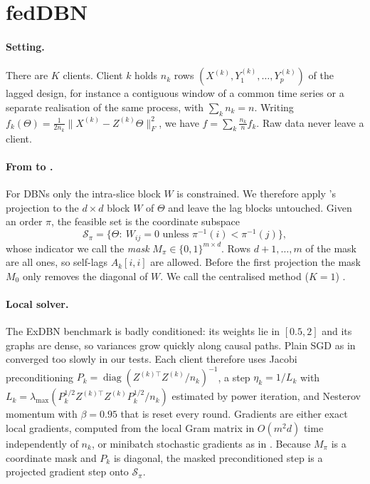 \section{fedDBN}
\label{sec:method}

\paragraph{Setting.}
There are $K$ clients. Client $k$ holds $n_k$ rows $(X^{(k)}, Y^{(k)}_1,\dots,Y^{(k)}_p)$ of
the lagged design, for instance a contiguous window of a common time series or a separate
realisation of the same process, with $\sum_k n_k=n$. Writing
$f_k(\Theta)=\frac{1}{2n_k}\|X^{(k)}-Z^{(k)}\Theta\|_F^2$, we have
$f=\sum_k \frac{n_k}{n} f_k$. Raw data never leave a client.

\paragraph{From \psidag{} to \psidbn.}
For DBNs only the intra-slice block $W$ is constrained. We therefore apply \psidag's
projection to the $d\times d$ block $W$ of $\Theta$ and leave the lag blocks
untouched. Given an order $\pi$, the feasible set is the coordinate subspace
\[
  \mathcal{S}_\pi=\{\Theta:\ W_{ij}=0 \text{ unless } \pi^{-1}(i)<\pi^{-1}(j)\},
\]
whose indicator we call the \emph{mask} $M_\pi\in\{0,1\}^{m\times d}$. Rows $d+1,\dots,m$ of the
mask are all ones, so self-lags $A_k[i,i]$ are allowed. Before the first projection the mask
$M_0$ only removes the diagonal of $W$. We call the centralised method ($K=1$) \psidbn.

\paragraph{Local solver.}
The ExDBN benchmark is badly conditioned: its weights lie in $[0.5,2]$ and its graphs are dense, so
variances grow quickly along causal paths. Plain SGD as in \psidag{} converged too slowly
in our tests. Each client therefore uses Jacobi preconditioning
$P_k=\operatorname{diag}(Z^{(k)\top}Z^{(k)}/n_k)^{-1}$, a step $\eta_k=1/L_k$ with
$L_k=\lambda_{\max}(P_k^{1/2} Z^{(k)\top}Z^{(k)} P_k^{1/2}/n_k)$ estimated by power iteration,
and Nesterov momentum \citep{nesterov1983method} with $\beta=0.95$ that is reset every round.
Gradients are either exact local gradients, computed from the local Gram matrix in
$O(m^2 d)$ time independently of $n_k$, or minibatch stochastic gradients as in \psidag.
Because $M_\pi$ is a coordinate mask and $P_k$ is diagonal, the masked preconditioned step
is a projected gradient step onto $\mathcal{S}_\pi$.


